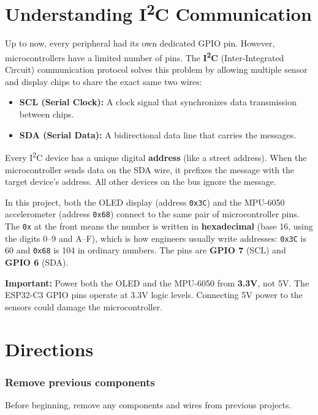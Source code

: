 \section{Understanding \texorpdfstring{I\textsuperscript{2}C}{I2C} Communication} \label{i2c_basics}

Up to now, every peripheral had its own dedicated GPIO pin. However, microcontrollers have a limited
number of pins. The \textbf{I\textsuperscript{2}C} (Inter-Integrated Circuit) communication protocol solves
this problem by allowing multiple sensor and display chips to share the exact same two wires:

\begin{itemize}
    \item \textbf{SCL (Serial Clock):} A clock signal that synchronizes data transmission between chips.
    \item \textbf{SDA (Serial Data):} A bidirectional data line that carries the messages.
\end{itemize}

Every I\textsuperscript{2}C device has a unique digital \textbf{address} (like a street address). When the
microcontroller sends data on the SDA wire, it prefixes the message with the target device's address.
All other devices on the bus ignore the message.

In this project, both the OLED display (address \texttt{0x3C}) and the MPU-6050 accelerometer (address
\texttt{0x68}) connect to the same pair of microcontroller pins. The \texttt{0x} at the front means the
number is written in \textbf{hexadecimal} (base 16, using the digits 0--9 and A--F), which is how
engineers usually write addresses: \texttt{0x3C} is 60 and \texttt{0x68} is 104 in ordinary numbers.
The pins are \textbf{GPIO 7} (SCL) and \textbf{GPIO 6} (SDA).

\begin{tcolorbox}[colback=yellow!10!white,colframe=yellow!50!black]
    \textbf{Important:} Power both the OLED and the MPU-6050 from \textbf{3.3V}, not 5V.
    The ESP32-C3 GPIO pins operate at 3.3V logic levels. Connecting 5V power to the sensors could damage
    the microcontroller.
\end{tcolorbox}

\section{Directions}

\subsubsection{Remove previous components}
Before beginning, remove any components and wires from previous projects.

